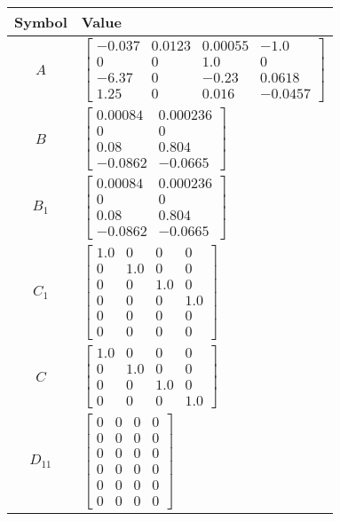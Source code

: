 \begin{tabular}{cl}
\hline
  Symbol  & Value                                                                                                                                              \\
\hline
   $A$    & $\left[\begin{matrix}-0.037 & 0.0123 & 0.00055 & -1.0\\0 & 0 & 1.0 & 0\\-6.37 & 0 & -0.23 & 0.0618\\1.25 & 0 & 0.016 & -0.0457\end{matrix}\right]$ \\
   $B$    & $\left[\begin{matrix}0.00084 & 0.000236\\0 & 0\\0.08 & 0.804\\-0.0862 & -0.0665\end{matrix}\right]$                                                \\
 $B_{1}$  & $\left[\begin{matrix}0.00084 & 0.000236\\0 & 0\\0.08 & 0.804\\-0.0862 & -0.0665\end{matrix}\right]$                                                \\
 $C_{1}$  & $\left[\begin{matrix}1.0 & 0 & 0 & 0\\0 & 1.0 & 0 & 0\\0 & 0 & 1.0 & 0\\0 & 0 & 0 & 1.0\\0 & 0 & 0 & 0\\0 & 0 & 0 & 0\end{matrix}\right]$          \\
   $C$    & $\left[\begin{matrix}1.0 & 0 & 0 & 0\\0 & 1.0 & 0 & 0\\0 & 0 & 1.0 & 0\\0 & 0 & 0 & 1.0\end{matrix}\right]$                                        \\
 $D_{11}$ & $\left[\begin{matrix}0 & 0 & 0 & 0\\0 & 0 & 0 & 0\\0 & 0 & 0 & 0\\0 & 0 & 0 & 0\\0 & 0 & 0 & 0\\0 & 0 & 0 & 0\end{matrix}\right]$                  \\

\end{tabular}
